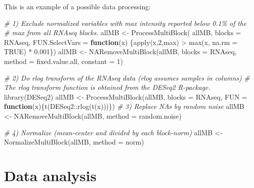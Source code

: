 \documentclass[
]{book}
\newenvironment{Shaded}{\begin{snugshade}}{\end{snugshade}}
\newcommand{\AttributeTok}[1]{\textcolor[rgb]{0.77,0.63,0.00}{#1}}
\newcommand{\CommentTok}[1]{\textcolor[rgb]{0.56,0.35,0.01}{\textit{#1}}}
\newcommand{\ConstantTok}[1]{\textcolor[rgb]{0.00,0.00,0.00}{#1}}
\newcommand{\ControlFlowTok}[1]{\textcolor[rgb]{0.13,0.29,0.53}{\textbf{#1}}}
\newcommand{\DecValTok}[1]{\textcolor[rgb]{0.00,0.00,0.81}{#1}}
\newcommand{\FloatTok}[1]{\textcolor[rgb]{0.00,0.00,0.81}{#1}}
\newcommand{\FunctionTok}[1]{\textcolor[rgb]{0.00,0.00,0.00}{#1}}
\newcommand{\NormalTok}[1]{#1}
\newcommand{\OtherTok}[1]{\textcolor[rgb]{0.56,0.35,0.01}{#1}}
\newcommand{\SpecialCharTok}[1]{\textcolor[rgb]{0.00,0.00,0.00}{#1}}
\newcommand{\StringTok}[1]{\textcolor[rgb]{0.31,0.60,0.02}{#1}}
\begin{document}
This is an example of a possible data processing:

\begin{Shaded}
\begin{Highlighting}[]
\CommentTok{\# 1) Exclude normalized variables with max intensity reported below 0.1\% of the}
\CommentTok{\#    max from all RNAseq blocks.}
\NormalTok{allMB }\OtherTok{\textless{}{-}} \FunctionTok{ProcessMultiBlock}\NormalTok{(}
\NormalTok{  allMB,}
  \AttributeTok{blocks =} \StringTok{\textquotesingle{}RNAseq\textquotesingle{}}\NormalTok{,}
  \AttributeTok{FUN.SelectVars =} \ControlFlowTok{function}\NormalTok{(x) \{}\FunctionTok{apply}\NormalTok{(x,}\DecValTok{2}\NormalTok{,max) }\SpecialCharTok{\textgreater{}} \FunctionTok{max}\NormalTok{(x, }\AttributeTok{na.rm =} \ConstantTok{TRUE}\NormalTok{) }\SpecialCharTok{*} \FloatTok{0.001}\NormalTok{\})}
\NormalTok{allMB }\OtherTok{\textless{}{-}} \FunctionTok{NARemoveMultiBlock}\NormalTok{(allMB, }\AttributeTok{blocks =} \StringTok{\textquotesingle{}RNAseq\textquotesingle{}}\NormalTok{,}
                             \AttributeTok{method =} \StringTok{\textquotesingle{}fixed.value.all\textquotesingle{}}\NormalTok{, }\AttributeTok{constant =} \DecValTok{1}\NormalTok{)}

\CommentTok{\# 2) Do rlog transform of the RNAseq data (rlog assumes samples in columns)}
\CommentTok{\#    The rlog transform function is obtained from the DESeq2 R{-}package.}
\FunctionTok{library}\NormalTok{(DESeq2)}
\NormalTok{allMB }\OtherTok{\textless{}{-}} \FunctionTok{ProcessMultiBlock}\NormalTok{(allMB, }\AttributeTok{blocks =} \StringTok{\textquotesingle{}RNAseq\textquotesingle{}}\NormalTok{,}
                            \AttributeTok{FUN =} \ControlFlowTok{function}\NormalTok{(x)\{}\FunctionTok{t}\NormalTok{(DESeq2}\SpecialCharTok{::}\FunctionTok{rlog}\NormalTok{(}\FunctionTok{t}\NormalTok{(x)))\})}
\CommentTok{\# 3) Replace NAs by random noise}
\NormalTok{allMB }\OtherTok{\textless{}{-}} \FunctionTok{NARemoveMultiBlock}\NormalTok{(allMB, }\AttributeTok{method =} \StringTok{\textquotesingle{}random.noise\textquotesingle{}}\NormalTok{)}

\CommentTok{\# 4) Normalize (mean{-}center and divided by each block{-}norm)}
\NormalTok{allMB }\OtherTok{\textless{}{-}} \FunctionTok{NormalizeMultiBlock}\NormalTok{(allMB, }\AttributeTok{method =} \StringTok{\textquotesingle{}norm\textquotesingle{}}\NormalTok{)}
\end{Highlighting}
\end{Shaded}

\hypertarget{PART2}{%
\section{Data analysis}\label{PART2}}
\end{document}
